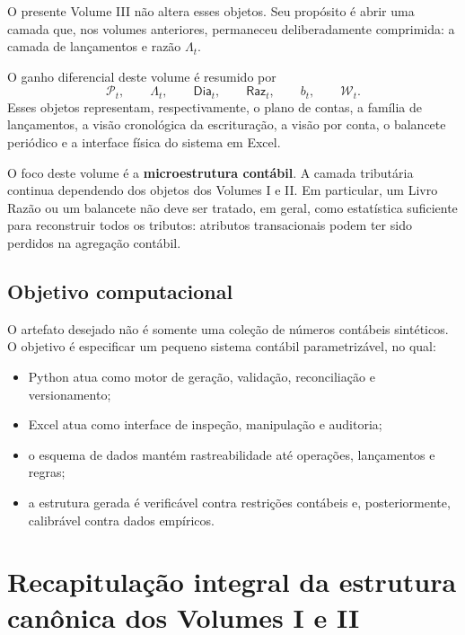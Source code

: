 \documentclass[11pt,a4paper]{article}
\newcommand{\Plano}{\mathcal{P}}
\newcommand{\Dia}{\mathsf{Dia}}
\newcommand{\Raz}{\mathsf{Raz}}
\newcommand{\Wb}{\mathcal{W}}
\begin{document}
O presente Volume III não altera esses objetos. Seu propósito é abrir uma camada que, nos volumes anteriores, permaneceu deliberadamente comprimida: a camada de lançamentos e razão $\Lambda_t$.

\begin{formalizacao}
O ganho diferencial deste volume é resumido por
\[
\boxed{
\Plano_t,\qquad
\Lambda_t,\qquad
\Dia_t,\qquad
\Raz_t,\qquad
b_t,\qquad
\Wb_t.
}
\]
Esses objetos representam, respectivamente, o plano de contas, a família de lançamentos, a visão cronológica da escrituração, a visão por conta, o balancete periódico e a interface física do sistema em Excel.
\end{formalizacao}

\begin{cuidado}
O foco deste volume é a \textbf{microestrutura contábil}. A camada tributária continua dependendo dos objetos dos Volumes I e II. Em particular, um Livro Razão ou um balancete não deve ser tratado, em geral, como estatística suficiente para reconstruir todos os tributos: atributos transacionais podem ter sido perdidos na agregação contábil.
\end{cuidado}

\subsection{Objetivo computacional}

O artefato desejado não é somente uma coleção de números contábeis sintéticos. O objetivo é especificar um pequeno sistema contábil parametrizável, no qual:
\begin{itemize}
    \item Python atua como motor de geração, validação, reconciliação e versionamento;
    \item Excel atua como interface de inspeção, manipulação e auditoria;
    \item o esquema de dados mantém rastreabilidade até operações, lançamentos e regras;
    \item a estrutura gerada é verificável contra restrições contábeis e, posteriormente, calibrável contra dados empíricos.
\end{itemize}

\section{Recapitulação integral da estrutura canônica dos Volumes I e II}
\end{document}
